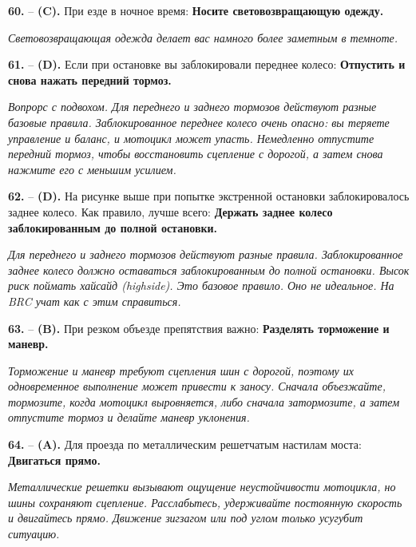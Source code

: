 \begin{minipage}{\linewidth}
\noindent\textbf{60.}  -- \textbf {(C).} При езде в ночное время:  \textbf {Носите световозвращающую одежду.} \par \textit {Световозвращающая одежда делает вас намного более заметным в темноте.} \\
\end{minipage}

\begin{minipage}{\linewidth}
\noindent\textbf{61.}  -- \textbf {(D).} Если при остановке вы заблокировали переднее колесо:  \textbf {Отпустить и снова нажать передний тормоз.} \par \textit {Вопрорс с подвохом. Для переднего и заднего тормозов действуют разные базовые правила. Заблокированное переднее колесо очень опасно: вы теряете управление и баланс, и мотоцикл может упасть. Немедленно отпустите передний тормоз, чтобы восстановить сцепление с дорогой, а затем снова нажмите его с меньшим усилием.} \\
\end{minipage}

\begin{minipage}{\linewidth}
\noindent\textbf{62.}  -- \textbf {(D).} На рисунке выше при попытке экстренной остановки заблокировалось заднее колесо. Как правило, лучше всего:  \textbf {Держать заднее колесо заблокированным до полной остановки.} \par \textit {Для переднего и заднего тормозов действуют разные правила. Заблокированное заднее колесо должно оставаться заблокированным до полной остановки. Высок риск поймать хайсайд (highside). Это базовое правило. Оно не идеальное. На BRC учат как с этим справиться.} \\
\end{minipage}

\begin{minipage}{\linewidth}
\noindent\textbf{63.}  -- \textbf {(B).} При резком объезде препятствия важно:  \textbf {Разделять торможение и маневр.} \par \textit {Торможение и маневр требуют сцепления шин с дорогой, поэтому их одновременное выполнение может привести к заносу. Сначала объезжайте, тормозите, когда мотоцикл выровняется, либо сначала затормозите, а затем отпустите тормоз и делайте маневр уклонения.} \\
\end{minipage}

\begin{minipage}{\linewidth}
\noindent\textbf{64.}  -- \textbf {(A).} Для проезда по металлическим решетчатым настилам моста:  \textbf {Двигаться прямо.} \par \textit {Металлические решетки вызывают ощущение неустойчивости мотоцикла, но шины сохраняют сцепление. Расслабьтесь, удерживайте постоянную скорость и двигайтесь прямо. Движение зигзагом или под углом только усугубит ситуацию.} \\
\end{minipage}

